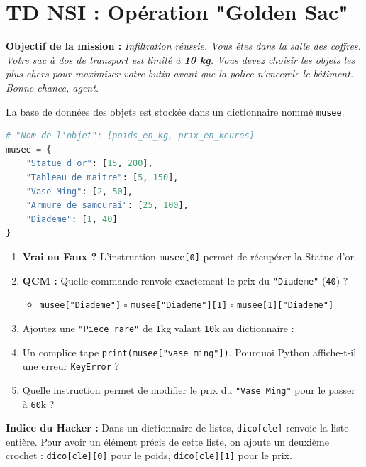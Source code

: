 \section*{TD NSI :  Opération "Golden Sac"}

\textbf{Objectif de la mission :} \textit{Infiltration réussie. Vous êtes dans la salle des coffres. Votre sac à dos de transport est limité à \textbf{10 kg}. Vous devez choisir les objets les plus chers pour maximiser votre butin avant que la police n'encercle le bâtiment. Bonne chance, agent.}

\begin{Exercise}[title={Infiltration du système de sécurité }]
La base de données des objets est stockée dans un dictionnaire nommé \texttt{musee}. 
\begin{lstlisting}[style=pythonstyle, language=Python]
# "Nom de l'objet": [poids_en_kg, prix_en_keuros]
musee = {
    "Statue d'or": [15, 200],
    "Tableau de maitre": [5, 150],
    "Vase Ming": [2, 50],
    "Armure de samourai": [25, 100],
    "Diademe": [1, 40]
}
\end{lstlisting}

\begin{enumerate}
    \item \textbf{Vrai ou Faux ?} L'instruction \texttt{musee[0]} permet de récupérer la Statue d'or. \dotfill
    \item \textbf{QCM :} Quelle commande renvoie exactement le prix du \texttt{"Diademe"} (\texttt{40}) ?
    \begin{itemize}
        \item[$\square$] \texttt{musee["Diademe"]} \quad $\square$ \texttt{musee["Diademe"][1]} \quad $\square$ \texttt{musee[1]["Diademe"]}
    \end{itemize}
    \item  Ajoutez une \texttt{"Piece rare"} de \texttt{1}kg valant \texttt{10}k\texteuro{} au dictionnaire : \dotfill
    \item  Un complice tape \texttt{print(musee["vase ming"])}. Pourquoi Python affiche-t-il une erreur \texttt{KeyError} ? \dotfill
    \item Quelle instruction permet de modifier le prix du \texttt{"Vase Ming"} pour le passer à \texttt{60}k\texteuro{} ? \dotfill
\end{enumerate}

\begin{Comprendre}
 \textbf{Indice du Hacker :} 
Dans un dictionnaire de listes, \texttt{dico[cle]} renvoie la liste entière. Pour avoir un élément précis de cette liste, on ajoute un deuxième crochet : \texttt{dico[cle][0]} pour le poids, \texttt{dico[cle][1]} pour le prix.
\end{Comprendre}
\end{Exercise}


